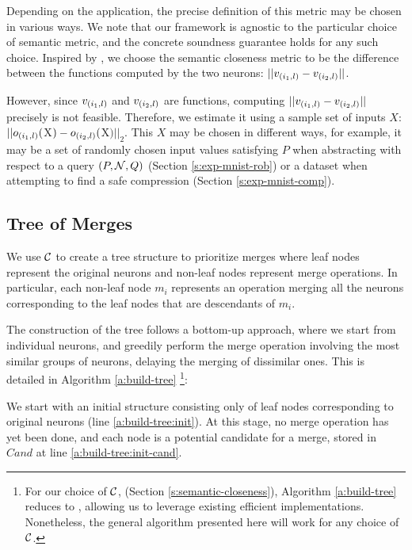 Depending on the application, the precise definition of this metric may be
chosen in various ways. We note that our framework is agnostic to the particular
choice of semantic metric, and the concrete soundness guarantee holds for any such
choice. Inspired by \cite{deep-abstract}, we choose the
semantic closeness metric to be the difference between the functions computed 
by the two neurons: $||v_{(i_1,l)} - v_{(i_2,l)}||$. 

However, since $v_{(i_1,l)}$ and $v_{(i_2,l)}$ are functions, computing
$||v_{(i_1,l)} - v_{(i_2,l)}||$ precisely is not feasible.
Therefore, we estimate it using a sample set of inputs $X$: $||o_{(i_1,l)}($X$)
- o_{(i_2,l)}($X$)||_2$. This $X$ may be chosen in different ways, for example, it
may be a set of randomly chosen input values satisfying $P$ when
abstracting with respect to a query $(P, \mathcal{N}, Q)$
(Section \ref{s:exp-mnist-rob}) or a dataset when attempting to find a
safe compression (Section \ref{s:exp-mnist-comp}).

\subsection{Tree of Merges}
\label{s:tree}

We use $\mathcal{C}$ to create a tree structure to prioritize merges where leaf nodes
represent the original neurons and non-leaf nodes represent merge operations. In
particular, each non-leaf node $m_i$ represents an operation merging all the neurons
corresponding to the leaf nodes that are descendants of $m_i$.

The construction of the tree follows a bottom-up approach, where we start from
individual neurons, and greedily perform the merge operation involving the most
similar groups of neurons, delaying the merging of dissimilar ones. This is
detailed in Algorithm \ref{a:build-tree} \footnote{ 
For our choice of $\mathcal{C}$, (Section \ref{s:semantic-closeness}), Algorithm
\ref{a:build-tree} reduces to \hcluster, allowing us to leverage existing
efficient implementations. Nonetheless, the
general algorithm presented here will work for any choice of $\mathcal{C}$. }:

We start with an initial structure
consisting only of leaf nodes corresponding to original neurons (line
\ref{a:build-tree:init}). At
this stage, no merge operation has yet been done, and each node is a potential
candidate for a merge, stored in $\mathit{Cand}$ at line
\ref{a:build-tree:init-cand}.

